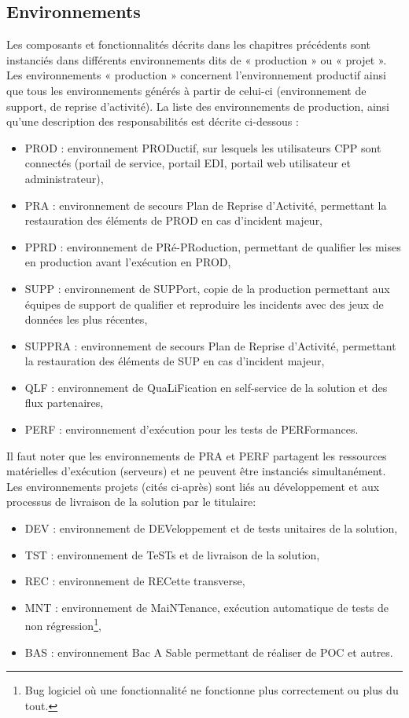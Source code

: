 \documentclass[12pt,a4paper]{article}
\begin{document}
\subsection{Environnements}
Les composants et fonctionnalités décrits dans les chapitres précédents sont instanciés dans différents environnements dits de « production » ou « projet ». Les environnements « production » concernent l’environnement productif ainsi que tous les environnements générés à partir de celui-ci (environnement de support, de reprise d’activité).
\smallbreak
La liste des environnements de production, ainsi qu’une description des responsabilités est décrite ci-dessous :
\smallbreak
\begin{itemize}
\item	PROD : environnement PRODuctif, sur lesquels les utilisateurs CPP sont connectés (portail de service, portail EDI, portail web utilisateur et administrateur),
\item	PRA : environnement de secours Plan de Reprise d’Activité, permettant la restauration des éléments de PROD en cas d’incident majeur,
\item	PPRD : environnement de PRé-PRoduction, permettant de qualifier les mises en production avant l'exécution en PROD,
\item	SUPP : environnement de SUPPort, copie de la production permettant aux équipes de support de qualifier et reproduire les incidents avec des jeux de données les plus récentes,
\item	SUPPRA : environnement de secours Plan de Reprise d’Activité, permettant la restauration des éléments de SUP en cas d’incident majeur,
\item	QLF : environnement de QuaLiFication en self-service de la solution et des flux partenaires,
\item	PERF : environnement d’exécution pour les tests de PERFormances.
\end{itemize}
\medbreak
Il faut noter que les  environnements de PRA et PERF partagent les ressources matérielles d'exécution (serveurs) et ne peuvent être instanciés simultanément.
Les environnements projets (cités ci-après) sont liés au développement et aux processus de livraison de la solution par le titulaire: 
\smallbreak
\begin{itemize}
\item	DEV : environnement de DEVeloppement et de tests unitaires de la solution,
\item	TST : environnement de TeSTs et de livraison de la solution,
\item	REC : environnement de RECette transverse,
\item	MNT : environnement de MaiNTenance, exécution automatique de tests de non régression\footnote{Bug logiciel où une fonctionnalité ne fonctionne plus correctement ou plus du tout.},
\item	BAS : environnement Bac A Sable permettant de réaliser de POC et autres.
\end{itemize}
\end{document}
